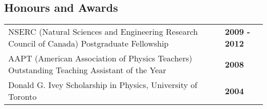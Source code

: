 \documentclass[margin,line]{res}
\newenvironment{list1}{
  \begin{list}{\ding{113}}{%
      \setlength{\itemsep}{0in}
      \setlength{\parsep}{0in} \setlength{\parskip}{0in}
      \setlength{\topsep}{0in} \setlength{\partopsep}{0in}
      \setlength{\leftmargin}{0.17in}}}{\end{list}}
\begin{document}
\begin{resume}
\section{\sc Honours and Awards}
\renewcommand{\arraystretch}{1.5}\addtolength{\tabcolsep}{-1pt}
\begin{tabular}{@{}p{4.5in}p{1.37in}}

NSERC (Natural Sciences and Engineering Research Council of Canada) Postgraduate Fellowship &  \hfill {\bf 2009 - 2012}\\
AAPT (American Association of Physics Teachers) Outstanding Teaching Assistant of the Year  &  \hfill {\bf 2008}\\
Donald G. Ivey Scholarship in Physics, University of Toronto & \hfill {\bf 2004}\\

\end{tabular}

%
%
%



\end{resume}
\end{document}
